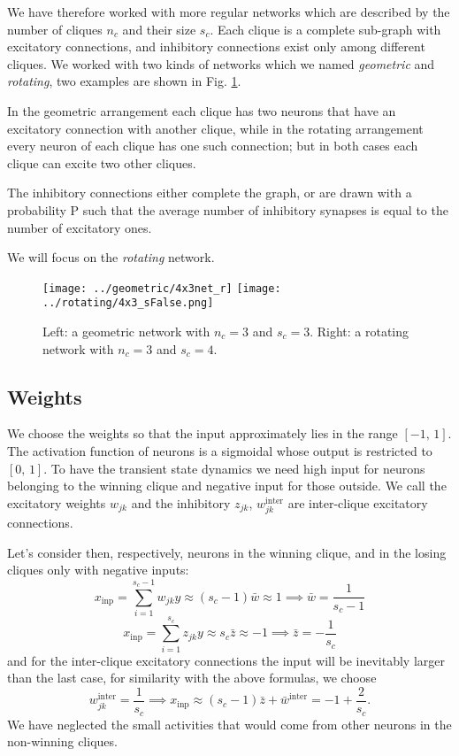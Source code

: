 \documentclass[12pt,a4paper]{article}
\begin{document}
		We have therefore worked with more regular networks which are described by the number of cliques $n_c$ and their size $s_c$. Each clique is a complete sub-graph with excitatory connections, and inhibitory connections exist only among different cliques. We worked with two kinds of networks which we named \emph{geometric} and \emph{rotating}, two examples are shown in Fig. \ref{fig:network}. 
		
		In the geometric arrangement each clique has two neurons that have an excitatory connection with another clique, while in the rotating arrangement every neuron of each clique has one such connection; but in both cases each clique can excite two other cliques. 
		
		The inhibitory connections either complete the graph, or are drawn with a probability P such that the average number of inhibitory synapses is equal to the number of excitatory ones.
		
		We will focus on the \emph{rotating} network.
		\begin{figure}
			\centering
			\texttt{[image: ../geometric/4x3net\_r]}
			\texttt{[image: ../rotating/4x3\_sFalse.png]}
			\caption{Left: a geometric network with $n_c = 3$ and $s_c = 3$. Right: a rotating network with $n_c = 3$ and $s_c = 4$.}
			\label{fig:network}
		\end{figure}
		
	\subsection{Weights}
		We choose the weights so that the input approximately lies in the range $[-1, \, 1]$. The activation function of neurons is a sigmoidal whose output is restricted to $[0, \, 1]$. To have the transient state dynamics we need high input for neurons belonging to the winning clique and negative input for those outside.
		We call the excitatory weights $w_{jk}$ and the inhibitory $z_{jk}$, $w_{jk}^{\text{inter}}$ are inter-clique excitatory connections.
		
		Let's consider then, respectively, neurons in the winning clique, and in the losing cliques only with negative inputs:
		\begin{equation}
			x_{\text{inp}} = \sum_{i=1}^{s_c - 1} w_{jk} y \approx \left(s_c -1 \right) \bar{w} \approx 1 \implies \bar{w} = \frac{1}{s_c - 1 }
		\end{equation}
		\begin{equation}
		x_{\text{inp}} = \sum_{i=1}^{s_c} z_{jk} y \approx s_c \bar{z} \approx -1 \implies \bar{z} = -\frac{1}{s_c}
		\end{equation}
		and for the inter-clique excitatory connections the input will be inevitably larger than the last case, for similarity with the above formulas, we choose 
		\begin{equation}
			w_{jk}^{\text{inter}} = \frac{1}{s_c} \implies x_{\text{inp}} \approx (s_c -1) \bar{z} +  \bar{w}^{\text{inter}} = -1 +\frac{2}{s_c}.
		\end{equation}
		We have neglected the small activities that would come from other neurons in the non-winning cliques.
		
\end{document}
